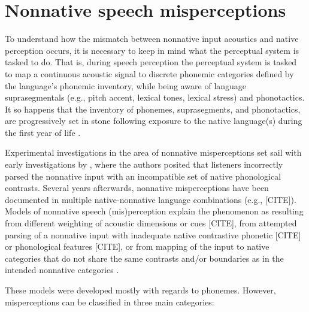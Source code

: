 \section{Nonnative speech misperceptions}

To understand how the mismatch between nonnative input acoustics and native perception occurs, it is necessary to keep in mind what the perceptual system is tasked to do. That is, during speech perception the perceptual system is tasked to map a continuous acoustic signal to discrete phonemic categories defined by the language's phonemic inventory, while being aware of language suprasegmentals (e.g., pitch accent, lexical tones, lexical stress) and phonotactics. It so happens that the inventory of phonemes, suprasegments, and phonotactics, are progressively set in stone following exposure to the native language(s) during the first year of life \cite{werker1984, jusczyk1994}.

Experimental investigations in the area of nonnative misperceptions set sail with early investigations by \cite{polivanov1939, trubetzkoy1939}, where the authors posited that listeners incorrectly parsed the nonnative input with an incompatible set of native phonological contrasts. Several years afterwards, nonnative misperceptions have been documented in multiple native-nonnative language combinations (e.g., [CITE]). Models of nonnative speech (mis)perception explain the phenomenon as resulting from different weighting of acoustic dimensions or cues [CITE], from attempted parsing of a nonnative input with inadequate native contrastive phonetic [CITE] or phonological features [CITE], or from mapping of the input to native categories that do not share the same contrasts and/or boundaries as in the intended nonnative categories \cite{best1994, kuhl1995}. 

These models were developed mostly with regards to phonemes. However, misperceptions can be classified in three main categories:

